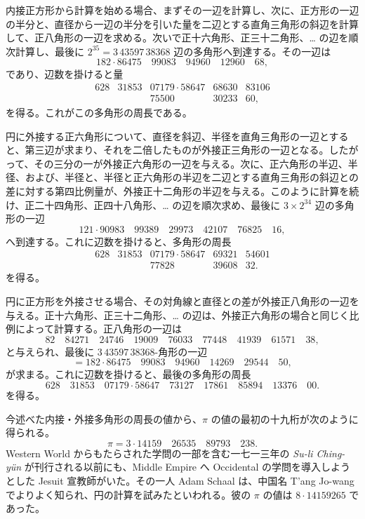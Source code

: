 \documentclass[11pt]{article}
\newcommand{\scanpage}[2]{\clearpage\setcounter{footnote}{0}\noindent{\footnotesize\color{gray}PDF #1 頁 · #2}\par\medskip}
\newcommand{\scanfooter}{}
\begin{document}
内接正方形から計算を始める場合、まずその一辺を計算し、次に、正方形の一辺の半分と、直径から一辺の半分を引いた量を二辺とする直角三角形の斜辺を計算して、正八角形の一辺を求める。次いで正十六角形、正三十二角形、\ldots{} の辺を順次計算し、最後に $2^{35}=3\,43597\,38368$ 辺の多角形へ到達する。その一辺は
\[
182\cdot86475\quad 99083\quad 94960\quad 12960\quad 68,
\]
であり、辺数を掛けると量
\[
\begin{array}{rrrrrr}
628&31853&07179\cdot58647&68630&83106\\
&&75500&30233&60,
\end{array}
\]
を得る。これがこの多角形の周長である。
\scanfooter

\scanpage{0154}{第20章、印刷頁140}
円に外接する正六角形について、直径を斜辺、半径を直角三角形の一辺とすると、第三辺が求まり、それを二倍したものが外接正三角形の一辺となる。したがって、その三分の一が外接正六角形の一辺を与える。次に、正六角形の半辺、半径、および、半径と、半径と正六角形の半辺を二辺とする直角三角形の斜辺との差に対する第四比例量が、外接正十二角形の半辺を与える。このように計算を続け、正二十四角形、正四十八角形、\ldots{} の辺を順次求め、最後に $3\times2^{34}$ 辺の多角形の一辺
\[
121\cdot90983\quad 99389\quad 29973\quad 42107\quad 76825\quad 16,
\]
へ到達する。これに辺数を掛けると、多角形の周長
\[
\begin{array}{rrrrrr}
628&31853&07179\cdot58647&69321&54601\\
&&77828&39608&32.
\end{array}
\]
を得る。

円に正方形を外接させる場合、その対角線と直径との差が外接正八角形の一辺を与える。正十六角形、正三十二角形、\ldots{} の辺は、外接正六角形の場合と同じく比例によって計算する。正八角形の一辺は
\[
82\quad 84271\quad 24746\quad 19009\quad 76033\quad 77448\quad 41939\quad 61571\quad 38,
\]
と与えられ、最後に $3\,43597\,38368$-角形の一辺
\[
=182\cdot86475\quad 99083\quad 94960\quad 14269\quad 29544\quad 50,
\]
が求まる。これに辺数を掛けると、最後の多角形の周長
\[
628\quad 31853\quad 07179\cdot58647\quad 73127\quad 17861\quad 85894\quad 13376\quad 00.
\]
を得る。

今述べた内接・外接多角形の周長の値から、$\pi$ の値の最初の十九桁が次のように得られる。
\[
\pi=3\cdot14159\quad 26535\quad 89793\quad 238.
\]
Western World からもたらされた学問の一部を含む一七一三年の \emph{Su-li Ching-yün} が刊行される以前にも、Middle Empire へ Occidental の学問を導入しようとした Jesuit 宣教師がいた。その一人 Adam Schaal は、中国名 T'ang Jo-wang でよりよく知られ、円の計算を試みたといわれる。彼の $\pi$ の値は $8\cdot14159265$ であった。
\scanfooter
\end{document}

